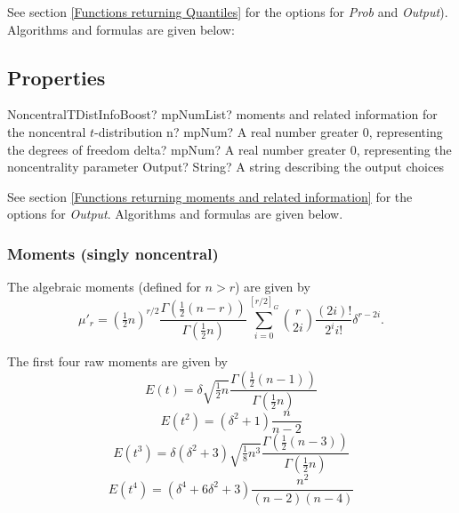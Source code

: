 \vspace{0.3cm}
See section \ref{Functions returning Quantiles} for the options for  {\itshape\sffamily Prob} and {\itshape\sffamily Output}). Algorithms and formulas are given below:



\subsection{Properties}
\label{NoncentraltDistributionPropertiesBoost}

\begin{mpFunctionsExtract}
	\mpFunctionThree
	{NoncentralTDistInfoBoost? mpNumList? moments and related information for the noncentral $t$-distribution}
	{n? mpNum? A real number greater 0, representing the degrees of freedom}
	{delta? mpNum? A real number greater 0, representing the noncentrality parameter}
	{Output? String? A string describing the output choices}
\end{mpFunctionsExtract}

\vspace{0.3cm}

See section \ref{Functions returning moments and related information} for the options for {\itshape\sffamily Output}. Algorithms and formulas are given below.



\subsubsection{Moments (singly noncentral)}

The algebraic moments (defined for $n>r$) are given by
\begin{equation}
	\mu'_r = \left({\tfrac{1}{2}n}\right)^{r/2} \frac{\Gamma\left(\tfrac{1}{2}(n-r)\right)}{\Gamma\left(\tfrac{1}{2}n\right)}  \sum_{i=0}^{[r/2]_G} { \binom{r}{2i} \frac{(2i)!} {2^i i!}} \delta^{r-2i}.
\end{equation}


The first four raw moments are given by
\begin{equation}
	E(t)=\delta \sqrt{\tfrac{1}{2}n} \frac{\Gamma\left(\tfrac{1}{2}(n-1)\right)}{\Gamma\left(\tfrac{1}{2}n\right)} 
\end{equation}
\begin{equation}
	E(t^2)= (\delta^2+1) \frac{n}{n-2} 
\end{equation}
\begin{equation}
	E(t^3)=\delta(\delta^2+3) \sqrt{\tfrac{1}{8}n^3} \frac{\Gamma\left(\tfrac{1}{2}(n-3)\right)}{\Gamma\left(\tfrac{1}{2}n\right)} 
\end{equation}
\begin{equation}
	E(t^4)= (\delta^4+ 6\delta^2+3) \frac{n^2}{(n-2)(n-4)} 
\end{equation}




